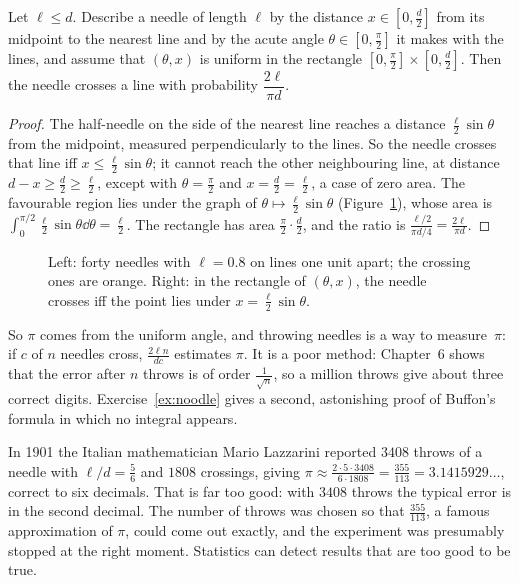 \begin{theorem}[Buffon]\label{thm:buffon}
Let $\ell\le d$. Describe a needle of length $\ell$ by the distance $x\in[0,\frac d2]$ from its midpoint to the
nearest line and by the acute angle $\theta\in[0,\frac\pi2]$ it makes with the lines, and assume that $(\theta,x)$ is
uniform in the rectangle $[0,\frac\pi2]\times[0,\frac d2]$. Then the needle crosses a line with probability
$\dfrac{2\ell}{\pi d}$.
\end{theorem}
\begin{proof}
The half-needle on the side of the nearest line reaches a distance $\frac\ell2\sin\theta$ from the midpoint,
measured perpendicularly to the lines. So the needle crosses that line iff $x\le\frac\ell2\sin\theta$; it cannot
reach the other neighbouring line, at distance $d-x\ge\frac d2\ge\frac\ell2$, except with $\theta=\frac\pi2$ and
$x=\frac d2=\frac\ell2$, a case of zero area. The favourable region lies under the graph of
$\theta\mapsto\frac\ell2\sin\theta$ (Figure~\ref{fig:buffon}), whose area is $\int_0^{\pi/2}\frac\ell2\sin\theta\dd\theta=\frac\ell2$.
The rectangle has area $\frac\pi2\cdot\frac d2$, and the ratio is $\frac{\ell/2}{\pi d/4}=\frac{2\ell}{\pi d}$.
\end{proof}

\begin{figure}[ht]
\centering
{}
\caption{Left: forty needles with $\ell=0.8$ on lines one unit apart; the crossing ones are orange. Right: in the
rectangle of $(\theta,x)$, the needle crosses iff the point lies under $x=\frac\ell2\sin\theta$.}
\label{fig:buffon}
\end{figure}

So $\pi$ comes from the uniform angle, and throwing needles is a way to measure~$\pi$: if $c$ of $n$ needles
cross, $\frac{2\ell n}{dc}$ estimates $\pi$. It is a poor method: Chapter~6 shows that the error after $n$ throws is
of order $\frac1{\sqrt n}$, so a million throws give about three correct digits. Exercise~\ref{ex:noodle} gives a
second, astonishing proof of Buffon's formula in which no integral appears.

\begin{remark}
In 1901 the Italian mathematician Mario Lazzarini reported $3408$ throws of a needle with $\ell/d=\frac56$ and
$1808$ crossings, giving $\pi\approx\frac{2\cdot5\cdot3408}{6\cdot1808}=\frac{355}{113}=3.1415929\ldots$, correct to
six decimals. That is far too good: with $3408$ throws the typical error is in the second decimal. The number of
throws was chosen so that $\frac{355}{113}$, a famous approximation of $\pi$, could come out exactly, and the
experiment was presumably stopped at the right moment. Statistics can detect results that are too good to be true.
\end{remark}


